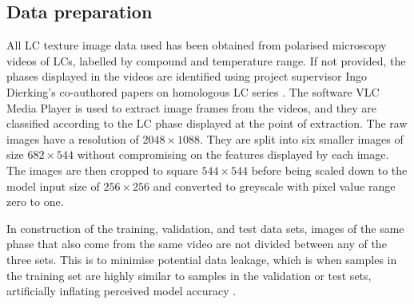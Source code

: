\documentclass[12pt]{article}
\begin{document}
\subsection{Data preparation}
All LC texture image data used has been obtained from polarised microscopy videos of LCs, labelled by compound and temperature range. If not provided, the phases displayed in the videos are identified using project supervisor Ingo Dierking's co-authored papers on homologous LC series \cite{Dierking94, Schacht95}. The software VLC Media Player \cite{VideoLan06} is used to extract image frames from the videos, and they are classified  according to the LC phase displayed at the point of extraction. The raw images have a resolution of $2048\times1088$. They are split into six smaller images of size $682\times544$ without compromising on the features displayed by each image. The images are then cropped to square $544\times544$ before being scaled down to the model input size of $256\times256$ and converted to greyscale with pixel value range zero to one.

In construction of the training, validation, and test data sets, images of the same phase that also come from the same video are not divided between any of the three sets. This is to minimise potential data leakage, which is when samples in the training set are highly similar to samples in the validation or test sets, artificially inflating perceived model accuracy \cite{Kaufman12}.
\end{document}
